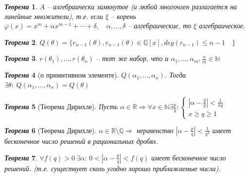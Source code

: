 \documentclass[a4paper,12pt]{article}
\newtheorem{teo2}{\textit{Теорема}}
\newcommand{\FI}{\varphi}
\newcommand{\TE}{\theta}
\newcommand{\AL}{\alpha}
\newcommand{\q}{\quad}
\newcommand{\Ra}{\Rightarrow}
\newcommand{\bb}[1]{\mathbb{#1}}
\begin{document}
\begin{formbox}{}
\begin{teo2} $A$ -- алгебраически замкнутое (и любой многочлен разлагается на линейные множители), т.е. если $\xi$ -- корень $\FI(x) = x^m + \AL x^{m-1} + \cdots + \delta, \q\AL,\dots,\delta $ -- алгебраические, то $\xi$ алгебраическое.
\end{teo2}
\end{formbox}
\begin{formbox}{}
\begin{teo2} $Q(\TE) = \{r_{n-1}(\TE), r_{n-1}(\TE)\in\bb{Q}[x], deg(r_{n-1})\le n - 1\q\} $
\end{teo2}
\end{formbox}
\begin{formbox}{}
\begin{teo2} $r(\TE_1),\dots,r(\TE_n)$ -- тот же набор, что и $\AL_1, \dots, \AL_m, \frac{n}{m}\in\bb{N}$%
\end{teo2}
\end{formbox}
\begin{formbox}{}
\begin{teo2} [о примитивном элементе] $Q(\AL_1,\dots, \AL_n)$. Тогда $\exists \TE:\;Q(\AL_1,\dots, \AL_n) = Q(\TE)$
\end{teo2}
\end{formbox}
\begin{formbox}{}
\begin{teo2}[Теорема Дирихле] Пусть $\AL\in\bb{R}\Ra \forall  x \in\bb{N} \exists \frac{p}{q}: \begin{cases} \left|\AL - \frac{q}{p}\right| < \frac{1}{xq} \\ x \ge q \ge 1   \end{cases} $
\end{teo2}
\end{formbox}
\begin{formbox}{}
\begin{teo2}[Теорема Дирихле] $\AL \in \bb{R} \setminus \bb{Q} \Ra $ неравенство $\left|\AL - \frac{p}{q} \right| < \frac{1}{q^2}$ имеет бесконечное число решений в рациональных дробях.
\end{teo2}
\end{formbox}
\begin{formbox}{}
\begin{teo2} $\forall f(q) > 0\: \exists \AL:\:0 < \left|\AL - \frac{p}{q} \right| < f(q)$ имеет бесконечное число решений. (т.е. существует сколь угодно хорошо приближаемые числа).
\end{teo2}
\end{formbox}
\end{document}
